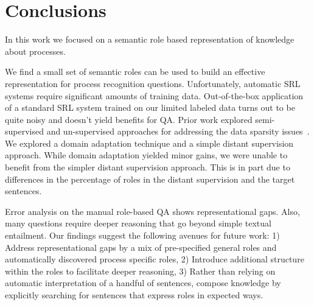 \section{Conclusions}
In this work we focused on a semantic role based representation of knowledge about processes.

We find a small set of semantic roles can be used to build an effective representation for process recognition questions.
Unfortunately, automatic SRL systems require significant amounts of training data. 
Out-of-the-box application of a standard SRL system trained on our limited labeled data turns out to be 
quite noisy and doesn't yield benefits for QA.
Prior work explored semi-supervised and un-supervised approaches for addressing the data sparsity issues~\cite{furstenau-emnlp2009,lang-emnlp2011,lang-naacl2010}. 
We explored a domain adaptation technique and a simple distant supervision approach.
While domain adaptation yielded minor gains, we were unable to benefit from the simpler distant supervision approach.
This is in part due to differences in the percentage of roles in the distant supervision and the target sentences.

Error analysis on the manual role-based QA shows representational gaps.
Also, many questions require deeper reasoning that go beyond simple textual entailment.
Our findings suggest the following avenues for future work: 
1) Address representational gaps by a mix of pre-specified general roles and automatically discovered process specific roles, 
2) Introduce additional structure within the roles to facilitate deeper reasoning,
3) Rather than relying on automatic interpretation of a handful of sentences, 
compose knowledge by explicitly searching for sentences that express roles in expected ways.
